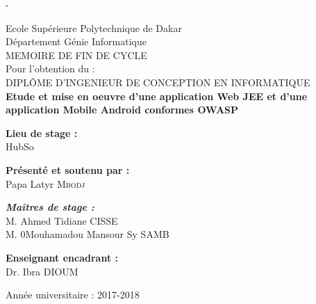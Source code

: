 \begin{titlingpage}
\begin{SingleSpace}
\begin{adjustwidth*}{\unitlength}{-\unitlength}
\begin{center}
				{\large Ecole Supérieure Polytechnique de Dakar }\\
				{\large Département Génie Informatique }\\
				\vspace{12mm}
				{\large MEMOIRE DE FIN DE CYCLE }~\\[0.1cm]
				{\large Pour l'obtention du : }~\\[0.1cm]
				{\large DIPLÔME D'INGENIEUR DE CONCEPTION EN INFORMATIQUE }~\\[0.1cm]
				\vspace{12mm}
				\textbf{\huge Etude et mise en oeuvre d'une application Web JEE et d'une application Mobile Android conformes OWASP }\\[4mm]
				\vspace{3mm}
				\hspace{3mm}
				\begin{center}
					{\large \textbf{Lieu de stage :}}\\
					HubSo\\
				\end{center}
				\vspace{3mm}
				\hspace{3mm}
					\begin{flushleft}
						{\large \textbf{Présenté et soutenu par :}}\\
						Papa Latyr \textsc{Mbodj}\\
					\end{flushleft}
				\vspace{3mm}
				\hspace{3mm}
					\begin{center}
						{\large \textbf{\emph{Maîtres de stage :} }}\\
						{\large {M. Ahmed Tidiane CISSE}}\\
						{\large {M. 0Mouhamadou Mansour Sy SAMB}}\\
					\end{center}
				\vspace{3mm}
				\hspace{3mm}
					\begin{flushright}
						{\large \textbf{Enseignant encadrant :} }\\
						{\large{Dr. Ibra DIOUM}}\\
					\end{flushright}
				\vspace{12mm}
				{\large Année universitaire : 2017-2018 }~\\[0.1cm]
			\end{center}
		\end{adjustwidth*}
	\end{SingleSpace}
\end{titlingpage}
\clearpage
